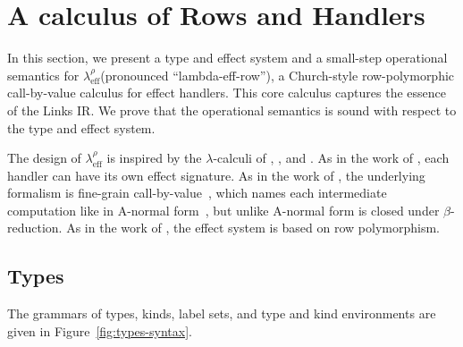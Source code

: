 \documentclass[12pt,mscres,cdtppar,twoside,openright,logo,rightchapter,normalheadings]{infthesis}
\theoremstyle{definition}
\newcommand{\Calc}{\ensuremath{\lambda_{\text{eff}}^\rho}\xspace}
\begin{document}
\section{A calculus of Rows and Handlers}
\label{sec:lambe-eff-row}

In this section, we present a type and effect system and a small-step
operational semantics for \Calc (pronounced ``lambda-eff-row''), a
Church-style row-polymorphic call-by-value calculus for effect
handlers.
%
This core calculus captures the essence of the Links IR.
%
We prove that the operational semantics is sound with respect to the
type and effect system.


The design of \Calc is inspired by the $\lambda$-calculi of
\citet{Kammar2013}, \citet{Pretnar2015}, and \citet{Lindley2012}.
%
As in the work of \citet{Kammar2013}, each handler can have its own
effect signature. As in the work of \citet{Pretnar2015}, the
underlying formalism is fine-grain call-by-value~\citep{LevyPT03},
which names each intermediate computation like in A-normal
form~\citep{Flanagan1993}, but unlike A-normal form is closed under
$\beta$-reduction. As in the work of \citet{Lindley2012}, the effect
system is based on row polymorphism.

\subsection{Types}
The grammars of types, kinds, label sets, and type and kind
environments are given in Figure~\ref{fig:types-syntax}.
\end{document}

